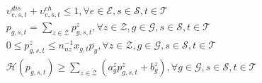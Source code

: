 \documentclass[lettersize,journal]{IEEEtran}
\newenvironment{newsubequations}{\small\begin{subequations}}{\end{subequations}}
\begin{document}
\begin{newsubequations}
\begin{align}
& \upsilon_{e,s,t}^{{dis}}  + \upsilon_{e,s,t}^{{ch}} \leq 1, \forall e\in\mathcal{E}, s\in\mathcal{S}, t\in\mathcal{T} \label{18-u}\\
& p_{g,s,t} = \sum\nolimits_{z\in\mathcal{Z}} p_{g,s,t}^{z},\forall z\in\mathcal{Z}, g\in\mathcal{G}, s\in\mathcal{S}, t\in\mathcal{T}\label{18-v}\\
& 0 \leq p_{g,s,t}^{z} \leq n_{nz}^{-1} x_{g,t}\overline{p_{g}},  \forall z\in\mathcal{Z}, g\in\mathcal{G}, s\in\mathcal{S}, t\in\mathcal{T}\label{18-w}\\
& \mathcal{H}(p_{g,s,t})\geq \sum\nolimits_{z\in\mathcal{Z}}\!\!(a_{g}^{z} p_{g,s,t}^{z} + b_{g}^{z}), \forall g\in\mathcal{G}, s\in\mathcal{S}, t\in\mathcal{T}\label{18-x}
\end{align}
\end{newsubequations}
\vspace{-0.6250cm}
\end{document}
